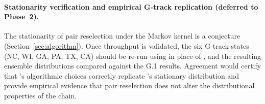 \paragraph{Stationarity verification and empirical G-track replication (deferred to Phase~2).}
The stationarity of pair reselection under the \re{} Markov kernel
is a conjecture (Section~\ref{sec:algorithm}).
Once throughput is validated, the six G-track states (NC, WI, GA, PA,
TX, CA) should be re-run using \re{} in place of \gc{}, and the
resulting ensemble distributions compared against the G.1 results.
Agreement would certify that \re{}'s algorithmic choices correctly
replicate \gc{}'s stationary distribution and provide empirical
evidence that pair reselection does not alter the distributional
properties of the chain.
